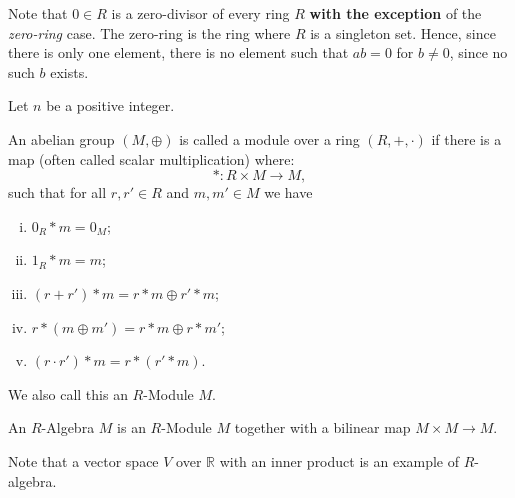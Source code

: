 Note that $0 \in R$ is a zero-divisor of every ring $R$ \textbf{with the exception}
of the \textit{zero-ring} case. The zero-ring is the ring where $R$ is a singleton
set. Hence, since there is only one element, there is no element such that
$a b = 0$ for $b\neq 0$, since no such $b$ exists.

\begin{example}
	Let $n$ be a positive integer.
\end{example}

\begin{definition}[$R$-Module]
	An abelian group $(M, \oplus)$ is called a module
	over a ring $(R,+,\cdot)$ if there is a map (often called
	scalar multiplication) where:
	\begin{displaymath}
		*:R \times M \to M,
	\end{displaymath}
	such that for all $r,r' \in R$ and $m,m' \in M$ we have
	\begin{enumerate}[(i)]
		\item $0_R * m = 0_M$;
		\item $1_R * m = m$;
		\item $(r+r') * m = r*m \oplus r'*m$;
		\item $r * (m \oplus m') = r*m \oplus r*m'$;
		\item $(r \cdot r')*m = r * (r' * m)$.
	\end{enumerate}

	We also call this an $R$-Module $M$.
\end{definition}

\begin{definition}[$R$-Algebra]
	An $R$-Algebra $M$ is an $R$-Module $M$ together with a
	bilinear map $M\times M \to M$.
\end{definition}

Note that a vector space $V$ over $\mathbb R$
with an inner product is an example of $R$-algebra.


